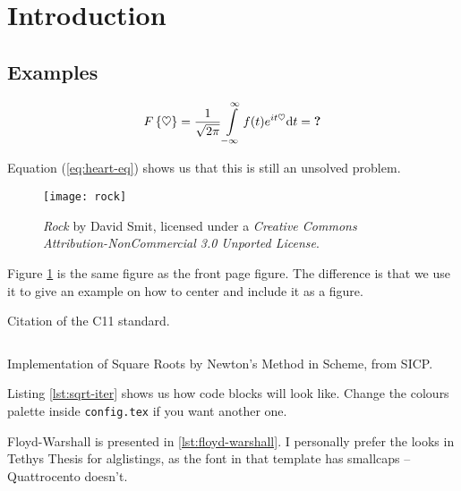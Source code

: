 
\section{Introduction}\label{sec:intro}

\subsection{Examples}

\lipsum[1-2]

\begin{equation} \label{eq:heart-eq}
  F\left\{ \heartsuit \right \} =
  \frac{1}{\sqrt{2\pi}} \int\limits_{-\infty}^{\infty} f(t) e^{i t \heartsuit} \mathrm{d} t
  = \text{\textbf{?}}
\end{equation}

Equation (\ref{eq:heart-eq}) shows us that this is still an unsolved problem.

\lipsum[3]

\begin{figure}
  \centering
  \texttt{[image: rock]}
  \caption[Rock]{\emph{Rock} by David Smit, licensed under a \emph{Creative
      Commons Attribution-NonCommercial 3.0 Unported License}.}
  \label{fig:rock}
\end{figure}

Figure \ref{fig:rock} is the same figure as the front page figure. The
difference is that we use it to give an example on how to center and include it
as a figure.

\lipsum[4]

Citation of the C11 standard\cite{iso2011c}.

\lipsum[11-12]

\begin{listing}
  \inputminted[frame=single,linenos,fontsize=\small,mathescape]{scm}{lst/sqrt-iter.scm}
  \caption[Square Roots in Scheme]{Implementation of Square Roots by Newton's
    Method in Scheme, from SICP.}
  \label{lst:sqrt-iter}
\end{listing}

Listing \ref{lst:sqrt-iter} shows us how code blocks will look like. Change the
colours palette inside \texttt{config.tex} if you want another one.



Floyd-Warshall is presented in \ref{lst:floyd-warshall}. I personally prefer the
looks in Tethys Thesis for alglistings, as the font in that template has
smallcaps -- Quattrocento doesn't.

\lipsum[13]
